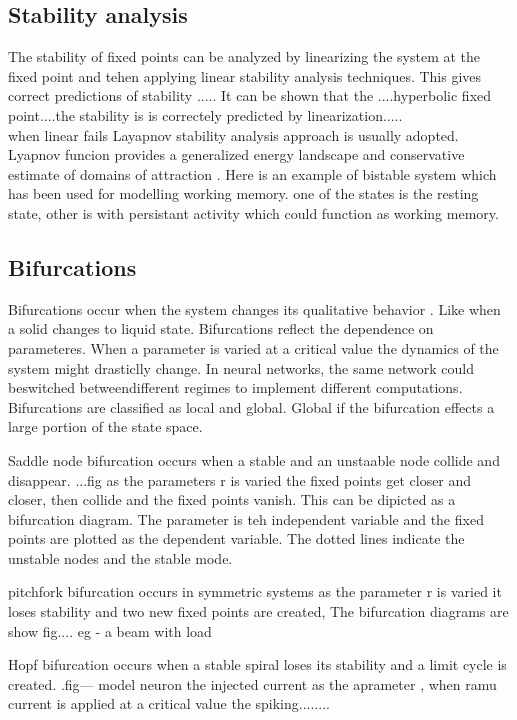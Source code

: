 \subsection{Stability analysis}
The stability of fixed points can be analyzed by linearizing the system at the fixed point and tehen applying linear stability analysis techniques. This gives correct predictions of stability .....
It can be shown that the ....hyperbolic fixed point....the stability is is correctely predicted by linearization.....\\when linear fails Layapnov stability analysis approach is usually adopted. Lyapnov funcion provides a generalized energy landscape and conservative estimate of domains of attraction . Here is an example of bistable system which has been used for modelling working memory. one of the states is the resting state, other is
 with persistant activity which could function as working memory.
\\
\subsection{Bifurcations}
Bifurcations occur when the system changes its qualitative behavior . Like when a solid changes to liquid state. Bifurcations reflect the dependence on parameteres. When a parameter is varied at a critical value the dynamics of the system might drasticlly change. In neural networks, the same network could beswitched betweendifferent regimes to implement different computations. Bifurcations are classified as local and global. Global if the bifurcation effects a large portion of the state space. 

Saddle node bifurcation occurs when a stable and an unstaable node collide and disappear. ...fig as the parameters r is varied the fixed points get closer and closer, then collide and the fixed points vanish. This can be dipicted as a bifurcation diagram. The parameter is teh independent variable and the fixed points are plotted as the dependent variable. The dotted lines indicate the unstable nodes and the stable mode.

pitchfork bifurcation occurs in symmetric systems as the parameter r is varied it loses stability and two new fixed points are created, The bifurcation diagrams are show fig.... eg - a beam with load

Hopf bifurcation occurs when a stable spiral loses its stability and a limit cycle is created. .fig--- model neuron the injected current as the aprameter , when ramu current is applied at a critical value the spiking........

